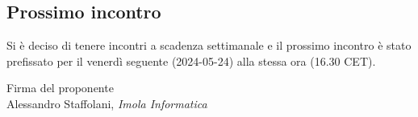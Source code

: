 \documentclass[a4paper, 11pt]{article}
\begin{document}
\subsection{Prossimo incontro}

Si è deciso di tenere incontri a scadenza settimanale e il prossimo incontro è stato prefissato per il venerdì seguente (2024-05-24) alla stessa ora (16.30 CET).

\vspace{60pt}
\begin{flushleft}
\hfill Firma del proponente \\
\vspace{50pt}
\hfill Alessandro Staffolani, \textit{Imola Informatica}
\end{flushleft}
\end{document}
